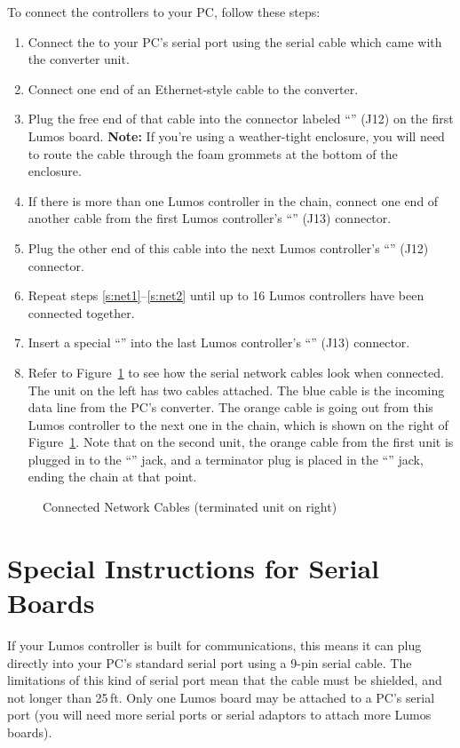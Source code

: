 \documentclass[letterpaper,twoside,onecolumn,openright,final]{memoir}
\begin{document}
To connect the controllers to your PC, follow these steps:
\begin{enumerate}
	\item	Connect the  to your PC's serial port using the serial cable
		which came with the converter unit.
	\item	Connect one end of an Ethernet-style cable to the  converter.
	\item	Plug the free end of that cable into the connector labeled ``'' (J12) on the first Lumos
		board.  {\bfseries Note:} If you're using a weather-tight enclosure, you will need to route the cable through
		the foam grommets at the bottom of the enclosure.
	\item\label{s:net1}
		If there is more than one Lumos controller in the chain, connect one end of another 
		cable
		from the first Lumos controller's ``'' (J13) connector.
	\item\label{s:net2}
		Plug the other end of this cable into the next Lumos controller's ``'' (J12) connector.
	\item	Repeat steps \ref{s:net1}--\ref{s:net2} until up to 16 Lumos controllers have been connected together.
	\item	Insert a special ``'' into the last Lumos controller's ``'' (J13) connector.
	\item	Refer to Figure~\ref{fig:netcables} to see how the serial network cables look
		when connected.  The unit on the left has two cables attached.  The blue cable is the incoming data line
		from the PC's  converter.  The orange cable is going out from this Lumos controller to the next one in the
		chain, which is shown on the right of Figure~\ref{fig:netcables}.  Note that on the second unit, the orange cable
		from the first unit is plugged in to the ``'' jack, and a terminator plug is placed in the ``'' jack,
		ending the chain at that point.
\end{enumerate}

\begin{figure}
	\centerline{ }
	\caption{Connected Network Cables (terminated unit on right)\label{fig:netcables}}
\end{figure}

\section{Special Instructions for  Serial Boards}\label{sec:rs232}
If your Lumos controller is built for  communications, this means it can plug directly into
your PC's standard serial port using a 9-pin serial cable.  The limitations of this kind of serial port
mean that the cable must be shielded, and not longer than 25\,ft.  Only one Lumos board may be attached
to a PC's serial port (you will need more serial ports or  serial adaptors to attach more Lumos
boards).
\end{document}
